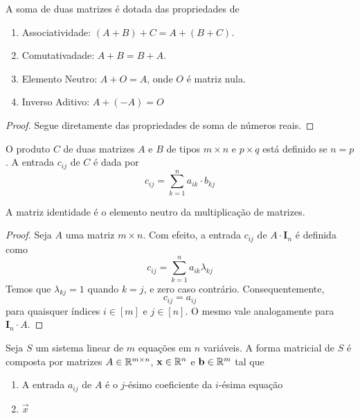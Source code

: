\begin{prop:propriedades soma matrizes}
A soma de duas matrizes é dotada das propriedades de
\begin{enumerate}
	\item Associatividade: $(A + B) + C = A + (B + C)$.
	\item Comutativadade: $A + B = B + A$.
	\item Elemento Neutro: $A + O = A$, onde $O$ é matriz nula.
	\item Inverso Aditivo: $A + (-A) = O$
\end{enumerate}
\end{prop:propriedades soma matrizes}
\begin{proof}
	Segue diretamente das propriedades de soma de números reais.
\end{proof}

\begin{def:produto de matrizes}
O produto $C$ de duas matrizes $A$ e $B$ de tipos $m \times n$ e $p \times q$ está definido
se $n = p$.
A entrada $c_{ij}$ de $C$ é dada por
\[
	c_{ij} = \sum_{k=1}^n a_{ik} \cdot b_{kj}
\]
\end{def:produto de matrizes}

\begin{prop:elemento neutro produto}
A matriz identidade é o elemento neutro da multiplicação de matrizes.
\end{prop:elemento neutro produto}
\begin{proof}
	Seja $A$ uma matriz $m \times n$.
	Com efeito, a entrada $c_{ij}$ de $A \cdot \mathbf I_n$ é definida como
	\[
		c_{ij} = \sum_{k=1}^n a_{ik} \lambda_{kj}
	\]
	Temos que $\lambda_{kj} = 1$ quando $k = j$, e zero caso contrário.
	Consequentemente,
	\[
		c_{ij} = a_{ij}
	\]
	para quaisquer índices $i \in [m]$ e $j \in [n]$.
	O mesmo vale analogamente para $\mathbf I_n \cdot A$.
\end{proof}

\begin{def:matriz do sistema}
Seja $S$ um sistema linear de $m$ equações em $n$ variáveis.
A forma matricial de $S$ é composta por matrizes $A \in \mathbb{R}^{m \times n}$,
$\mathbf x \in \mathbb{R}^n$ e $\mathbf b \in \mathbb{R}^m$ tal que
\begin{enumerate}
	\item A entrada $a_{ij}$ de $A$ é o $j$-ésimo coeficiente da $i$-ésima equação
	\item $\vec x$
\end{enumerate}
\end{def:matriz do sistema}
